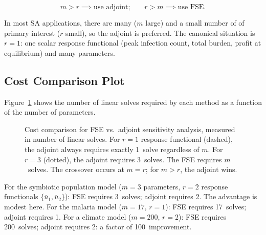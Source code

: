 \begin{equation}
  \boxed{m > r \implies \text{use adjoint;} \qquad
         r > m \implies \text{use FSE}.}
  \label{eq:decisionrule}
\end{equation}

In most SA applications, there are many \POIs ($m$ large) and
a small number of \QOIs of primary interest ($r$ small), so
the adjoint is preferred. The canonical situation is $r = 1$:
one scalar response functional (peak infection count, total burden,
profit at equilibrium) and many parameters.

\subsection{Cost Comparison Plot}

Figure~\ref{fig:costcomp} shows the number of linear solves
required by each method as a function of the number of parameters.

\begin{figure}[htb]
\centering
{}
\caption{Cost comparison for FSE vs.\ adjoint sensitivity analysis,
         measured in number of linear solves.
         For $r = 1$ response functional (dashed), the adjoint
         always requires exactly 1~solve regardless of $m$.
         For $r = 3$ (dotted), the adjoint requires 3~solves.
         The FSE requires $m$~solves.
         The crossover occurs at $m = r$; for $m > r$, the adjoint wins.}
\label{fig:costcomp}
\end{figure}

For the symbiotic population model ($m = 3$ parameters,
$r = 2$ response functionals $\{\bar{u}_1, \bar{u}_2\}$):
FSE requires 3~solves; adjoint requires 2.
The advantage is modest here.
For the malaria model ($m = 17$, $r = 1$): FSE requires 17~solves;
adjoint requires 1.
For a climate model ($m = 200$, $r = 2$): FSE requires 200~solves;
adjoint requires 2: a factor of 100~improvement.

